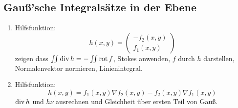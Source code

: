  \subsection{Gauß'sche Integralsätze in der Ebene}
 \begin{enumerate}
     \item Hilfsfunktion:
        \begin{equation*}
            h(x,y) =
            \begin{pmatrix}
                -f_2(x,y)\\
                f_1(x,y)
            \end{pmatrix}
        \end{equation*}
        zeigen dass $\iint \operatorname{div} h = - \iint \operatorname{rot} f$, Stokes anwenden, $f$ durch
        $h$ darstellen, Normalenvektor normieren, Linienintegral.
    \item Hilfsfunktion:
        \begin{equation*}
            h(x,y) = f_1(x,y) \nabla f_2(x,y) - f_2(x,y) \nabla f_1(x,y)
        \end{equation*}
        $\operatorname{div} h$ und $h \nu$ ausrechnen und Gleichheit über ersten Teil von Gauß.
 \end{enumerate}
